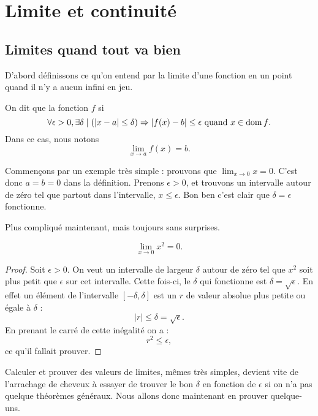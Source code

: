 \section{Limite et continuité}


\subsection{Limites quand tout va bien}

D'abord définissons ce qu'on entend par la limite d'une fonction en un point quand il n'y a aucun infini en jeu.
\begin{definition}		\label{DefLimPointSansInfini}
 On dit que la fonction $f$  si 
\[ 
  \forall \epsilon>0,\exists\delta\mid (| x-a |\leq\delta)\Rightarrow | f(x)-b |\leq \epsilon\text{ quand $x\in\operatorname{dom} f$}.
\]
Dans ce cas, nous notons
\begin{equation}
\lim_{x\to a}f(x)=b.
\end{equation} 
\end{definition}

Commençons par un exemple très simple : prouvons que $\lim_{x\to 0}x=0$. C'est donc $a=b=0$ dans la définition. Prenons $\epsilon>0$, et trouvons un intervalle autour de zéro tel que partout dans l'intervalle, $x\leq \epsilon$. Bon ben c'est clair que $\delta=\epsilon$ fonctionne.

Plus compliqué maintenant, mais toujours sans surprises.

\begin{proposition}
\[ 
  \lim_{x\to 0}x^2=0.
\]

\end{proposition}

\begin{proof}
Soit $\epsilon>0$. On veut un intervalle de largeur $\delta$ autour de zéro tel que $x^2$ soit plus petit que $\epsilon$ sur cet intervalle. Cette fois-ci, le $\delta$ qui fonctionne est $\delta=\sqrt{\epsilon}$. En effet un élément de l'intervalle $[-\delta,\delta]$ est un $r$ de valeur absolue plus petite ou égale à $\delta$ : 
\[ 
| r |\leq\delta=\sqrt{\epsilon}.
\]
En prenant le carré de cette inégalité on a :
\[ 
  r^2\leq\epsilon,
\]
ce qu'il fallait prouver.
\end{proof}


Calculer et prouver des valeurs de limites, mêmes très simples, devient vite de l'arrachage de cheveux à essayer de trouver le bon $\delta$ en fonction de $\epsilon$ si on n'a pas quelque théorèmes généraux. Nous allons donc maintenant en prouver quelque-uns.

